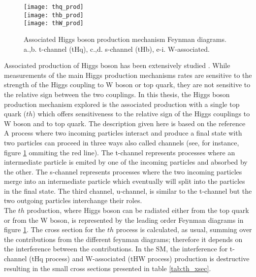 \begin{figure}[h!]
\centering
\texttt{[image: thq\_prod]}\\
\texttt{[image: thb\_prod]}\\
\texttt{[image: thW\_prod]}\\
\caption[Associated Higgs boson production mechanism Feynman diagrams]{Associated Higgs boson production mechanism Feynman diagrams. a.,b. t-channel (tHq), c.,d. s-channel (tHb), e-i. W-associated.}
\label{th_prod}
\end{figure}

\noindent \noindent Associated production of Higgs boson has been extensively studied \cite{maltoni1, biswas, farina,tait, maltoni2}. While measurements of the main Higgs production mechanisms rates are sensitive to the strength of the Higgs coupling to W boson or top quark, they are not sensitive to the relative sign between the two couplings. In this thesis, the Higgs boson production mechanism explored is the associated production with a single top quark ($th$) which offers sensitiveness to the relative sign of the Higgs couplings to W boson and to top quark. The description given here is based on the reference \cite{farina}\\

\noindent A process where two incoming particles interact and produce a final state with two particles can proceed in three ways also called channels (see, for instance, figure \ref{th_prod} ommiting the red line). The t-channel represents processes where an intermediate particle is emited by one of the incoming particles and absorbed by the other. The s-channel represents processes where the two incoming particles merge into an intermediate particle which eventually will split into the particles in the final state. The third channel, u-channel, is similar to the t-channel but the two outgoing particles interchange their roles.\\

\noindent The $th$ production, where Higgs boson can be radiated either from the top quark or from the W boson, is represented by the leading order Feynman diagrams in figure \ref{th_prod}. The cross section for the $th$ process is calculated, as usual, summing over the contributions from the different feynman diagrams; therefore it depends on the interference between the contributions. In the SM, the interference for t-channel (tHq process)  and W-associated (tHW process) production is destructive \cite{maltoni1} resulting in the small cross sections presented in table \ref{tab:th_xsec}. 

